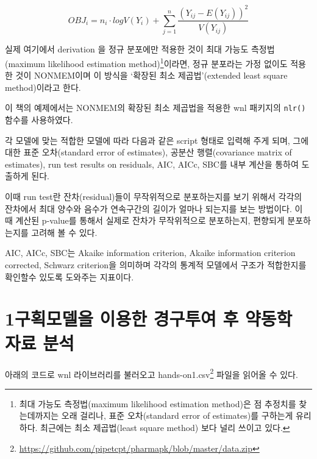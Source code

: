 \documentclass[
  11pt,
  krantz2, a4paper, twoside]{krantz}
\theoremstyle{definition}
\theoremstyle{definition}
\theoremstyle{definition}
\theoremstyle{definition}
\theoremstyle{remark}
\begin{document}
\begin{equation}
OBJ_i = n_i \cdot logV(Y_i) + \sum_{j=1}^{n} \frac{(Y_{ij} - E(Y_{ij}))^2}{V(Y_{ij})}
\label{eq:eq5-4}
\end{equation}

실제 여기에서 derivation 을 정규 분포에만 적용한 것이 최대 가능도 측정법(maximum likelihood estimation method)\footnote{최대 가능도 측정법(maximum likelihood estimation method)은 점 추정치를 찾는데까지는 오래 걸리나, 표준 오차(standard error of estimates)를 구하는게 유리하다. 최근에는 최소 제곱법(least square method) 보다 널리 쓰이고 있다.}이라면, 정규 분포라는 가정 없이도 적용한 것이 NONMEM이며 이 방식을 `확장된 최소 제곱법'(extended least square method)이라고 한다. 

이 책의 예제에서는 NONMEM의 확장된 최소 제곱법을 적용한 wnl 패키지의 \texttt{nlr()} 함수를 사용하였다.

각 모델에 맞는 적합한 모델에 따라 다음과 같은 script 형태로 입력해 주게 되며, 그에 대한 표준 오차(standard error of estimates), 공분산 행렬(covariance matrix of estimates), run test results on residuals, AIC, AICc, SBC를 내부 계산을 통하여 도출하게 된다.

이때 run test란 잔차(residual)들이 무작위적으로 분포하는지를 보기 위해서 각각의
잔차에서 최대 양수와 음수가 연속구간의 길이가 얼마나 되는지를 보는
방법이다. 이 때 계산된 p-value를 통해서 실제로 잔차가 무작위적으로 분포하는지, 편향되게 분포하는지를 고려해 볼 수 있다.

AIC, AICc, SBC는 Akaike information criterion, Akaike information
criterion corrected, Schwarz criterion을 의미하며 각각의 통계적 모델에서
구조가 적합한지를 확인할수 있도록 도와주는 지표이다.

\section{\texorpdfstring{1구획모델을 이용한 경구투여 후 약동학 자료 분석}{1구획모델을 이용한 경구투여 후 약동학 자료 분석}}\label{uxad6cuxd68duxbaa8uxb378uxc744-uxc774uxc6a9uxd55c-uxacbduxad6cuxd22cuxc5ec-uxd6c4-uxc57duxb3d9uxd559-uxc790uxb8cc-uxbd84uxc11d}

아래의 코드로 wnl 라이브러리를 불러오고 hands-on1.csv\footnote{\url{https://github.com/pipetcpt/pharmapk/blob/master/data.zip}} 파일을 읽어올 수 있다.
\end{document}
